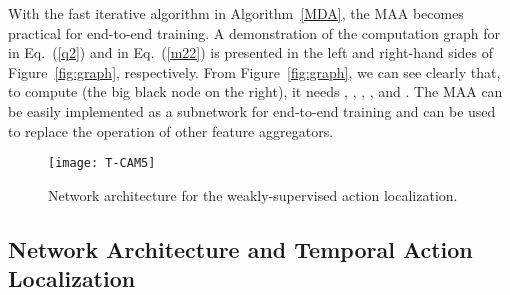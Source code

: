 \documentclass{article} \usepackage{iclr2019_conference,times}
\begin{document}
With the fast iterative algorithm in Algorithm~\ref{MDA}, the MAA becomes practical for end-to-end training.
A demonstration of the computation graph for  in Eq.~(\ref{q2}) and  in Eq.~(\ref{m22}) is presented in the left and right-hand sides of Figure~\ref{fig:graph}, respectively. 
From Figure~\ref{fig:graph}, we can see clearly that, to compute  (the big black node on the right), it needs , , , , and .
The MAA can be easily implemented as a subnetwork for end-to-end training and can be used to replace the operation of other feature aggregators.









































































\begin{figure*}[t!]
\centering
\texttt{[image: T-CAM5]}\vspace{-4mm}
\caption{Network architecture for the weakly-supervised action localization.}
\vspace{-4mm}
\label{fig:tcam}
\end{figure*}
\vspace{-2mm}


\subsection{Network Architecture and Temporal Action Localization}~\label{network_architecture}
\end{document}
